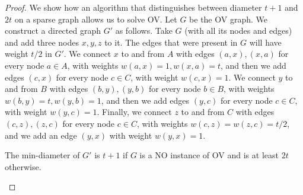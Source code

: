 \begin{proof}

We show how an algorithm that distinguishes between diameter $t+1$ and $2t$ on a sparse graph allows us to solve OV.
Let $G$ be the OV graph. We construct a directed graph $G'$ as follows.
Take $G$ (with all its nodes and edges) and add three nodes $x,y,z$ to it.
The edges that were present in $G$ will have weight $t/2$ in $G'$.
We connect $x$ to and from $A$ with edges $(a,x),(x,a)$ for every node $a \in A$, with weights $w(a,x)=1,w(x,a)=t$, and then we add edges $(c,x)$ for every node $c \in C$, with weight $w(c,x)=1$.
We connect $y$ to and from $B$ with edges $(b,y),(y,b)$ for every node $b \in B$, with weights $w(b,y)=t, w(y,b)=1$,  and then we add edges $(y,c)$ for every node $c \in C$, with weight $w(y,c)=1$.
Finally, we connect $z$ to and from $C$ with edges $(c,z),(z,c)$ for every node $c \in C$, with weights $w(c,z)=w(z,c)=t/2$, and we add an edge $(y,x)$ with weight $w(y,x)=1$.

\begin{claim}
The min-diameter of $G'$ is $t+1$ if $G$ is a NO instance of OV and is at least $2t$ otherwise.
\end{claim}


\end{proof}
